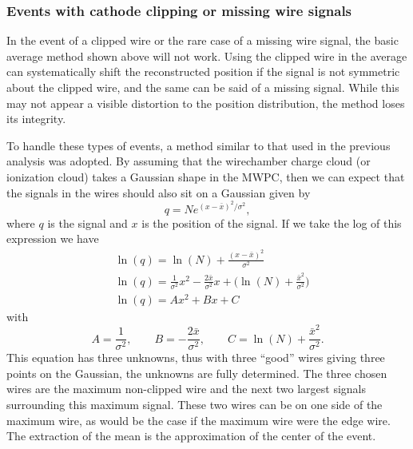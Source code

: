 \subsubsection{Events with cathode clipping or missing wire signals}

In the event of a clipped wire or the rare case of a missing wire signal, the basic average method
shown above will not work. Using the clipped wire in the average can systematically shift the
reconstructed position if the signal is not symmetric about the clipped wire, and the same can
be said of a missing signal. While this may not appear a visible distortion to the
position distribution, the method
loses its integrity.

To handle these types of events, a method similar to that used in the previous analysis
\cite{mpmThesis} was adopted. By assuming that the wirechamber charge cloud (or
ionization cloud) takes a Gaussian shape in the MWPC, then we can expect that the signals
in the wires should also sit on a Gaussian given by
%
\begin{equation}
  q = Ne^{(x-\bar{x})^2/\sigma^2},
\end{equation}
%
where $q$ is the signal and $x$ is the position of the signal. If we take the log of this
expression we have
%
\begin{align} \label{eq:gaussPos}
   &\ln(q) = \ln(N) + \frac{(x-\bar{x})^2}{\sigma^2} \\
   &\ln(q) = \frac{1}{\sigma^2}x^2 - \frac{2\bar{x}}{\sigma^2}x + \Big(\ln(N)+\frac{\bar{x}^2}{\sigma^2}\Big) \\
   &\ln(q) = Ax^2 + Bx + C 
\end{align}
%
with
\begin{equation}
  A = \frac{1}{\sigma^2}, \qquad B = - \frac{2\bar{x}}{\sigma^2}, \qquad C = \ln(N)+\frac{\bar{x}^2}{\sigma^2}.
\end{equation}
This equation has three unknowns, thus with three ``good'' wires giving three points on the Gaussian, the unknowns
are fully determined. The three chosen wires are the maximum non-clipped wire and the next two largest signals
surrounding this maximum signal. These two wires can be on one side of the maximum wire, as would be the case if the
maximum wire were the edge wire. The extraction of the mean is the approximation of the center of the event.

